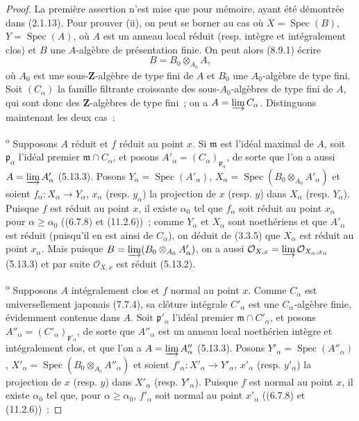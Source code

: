 \begin{proof}
La première assertion n'est mise que pour mémoire, ayant été démontrée dans
(2.1.13). Pour prouver (ii), on peut se borner au cas où $X=\operatorname{Spec}(B)$,
$Y=\operatorname{Spec}(A)$, où $A$ est un anneau local réduit (resp. intègre et
intégralement clos) et $B$ une $A$-algèbre de présentation finie. On peut alors
(8.9.1) écrire
\[
B=B_0\otimes_{A_0}A,
\]
où $A_0$ est une sous-$\mathbf Z$-algèbre de type fini de $A$ et $B_0$ une
$A_0$-algèbre de type fini. Soit $(C_\alpha)$ la famille filtrante croissante
des sous-$A_0$-algèbres de type fini de $A$, qui sont donc des
$\mathbf Z$-algèbres de type fini~; on a $A=\varinjlim C_\alpha$. Distinguons
maintenant les deux cas~:

\textsuperscript{o} Supposons $A$ réduit et $f$ réduit au point
$x$. Si $\mathfrak m$ est l'idéal maximal de $A$, soit
$\mathfrak p_\alpha$ l'idéal premier $\mathfrak m\cap C_\alpha$, et posons
$A'_\alpha=(C_\alpha)_{\mathfrak p_\alpha}$, de sorte que l'on a aussi
$A=\varinjlim A'_\alpha$ (5.13.3). Posons
$Y_\alpha=\operatorname{Spec}(A'_\alpha)$,
$X_\alpha=\operatorname{Spec}(B_0\otimes_{A_0}A'_\alpha)$ et soient
$f_\alpha:X_\alpha\to Y_\alpha$, $x_\alpha$ (resp. $y_\alpha$) la projection
de $x$ (resp. $y$) dans $X_\alpha$ (resp. $Y_\alpha$). Puisque $f$ est réduit
au point $x$, il existe $\alpha_0$ tel que $f_\alpha$ soit réduit au point
$x_\alpha$ pour $\alpha\geq\alpha_0$ ((6.7.8) et (11.2.6))~; comme
$Y_\alpha$ et $X_\alpha$ sont noethériens et que $A'_\alpha$ est réduit
(puisqu'il en est ainsi de $C_\alpha$), on déduit de (3.3.5) que $X_\alpha$
est réduit au point $x_\alpha$. Mais puisque
$B=\varinjlim(B_0\otimes_{A_0}A'_\alpha)$, on a aussi
$\mathcal O_{X,x}=\varinjlim\mathcal O_{X_\alpha,x_\alpha}$ (5.13.3) et par
suite $\mathcal O_{X,x}$ est réduit (5.13.2).

\textsuperscript{o} Supposons $A$ intégralement clos et $f$ normal
au point $x$. Comme $C_\alpha$ est universellement japonais (7.7.4), sa
clôture intégrale $C'_\alpha$ est une $C_\alpha$-algèbre finie, évidemment
contenue dans $A$. Soit $\mathfrak p'_\alpha$ l'idéal premier
$\mathfrak m\cap C'_\alpha$, et posons
$A''_\alpha=(C'_\alpha)_{\mathfrak p'_\alpha}$, de sorte que $A''_\alpha$
est un anneau local noethérien intègre et intégralement clos, et que l'on a
$A=\varinjlim A''_\alpha$ (5.13.3). Posons
$Y'_\alpha=\operatorname{Spec}(A''_\alpha)$,
$X'_\alpha=\operatorname{Spec}(B_0\otimes_{A_0}A''_\alpha)$ et soient
$f'_\alpha:X'_\alpha\to Y'_\alpha$, $x'_\alpha$ (resp. $y'_\alpha$) la
projection de $x$ (resp. $y$) dans $X'_\alpha$ (resp. $Y'_\alpha$). Puisque
$f$ est normal au point $x$, il existe $\alpha_0$ tel que, pour
$\alpha\geq\alpha_0$, $f'_\alpha$ soit normal au point $x'_\alpha$ ((6.7.8)
et (11.2.6))~;


\end{proof}
